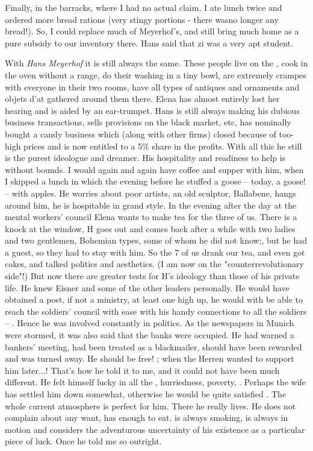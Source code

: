 Finally, in the barracks, where I had no actual claim, I ate lunch twice and ordered more bread rations (very stingy portions - there wasno longer any bread!). So, I could replace much of Meyerhof's, and still bring much home as a pure subsidy to our inventory there. Hans said that zi was a very apt student.

With \textit{Hans Meyerhof} it is still always the same. These people live on the , cook in the oven without a range, do their washing in a tiny bowl, are extremely crampes with everyone in their two rooms, have all types of antiques and ornaments and objets d'at gathered around them there. Elena has almost entirely lost her hearing and is aided by an ear-trumpet. Hans is still always making his dubious business transactions, sells provisions on the black market, etc, has nominally bought a candy business which (along with other firms) closed because of too-high prices and is now entitled to a 5\% share in the profits. With all this he still is the purest ideologue and dreamer. His hospitality and readiness to help is without bounds. I would again and again have coffee and supper with him,  when I skipped a lunch in which the evening before he stuffed a goose -- today, a goose! -- with apples. He worries about poor artists, an old sculptor, Ballabene, hangs around him, he is hospitable in grand style. In the evening after the day at the mental workers' council Elena wants to make tea for the three of us. There is a knock at the window, H goes out and comes back after a while with two ladies and two gentlemen, Bohemian types, some of whom he did not know;, but he had a guest, so they had to stay with him. So the 7 of us drank our tea, and even got cakes, and talked politics and aesthetics. (I am now on the "counterrevolutionary side"!) But now there are greater tests for H's ideology than those of his private life. He knew Eisner and some of the other leaders personally. He would have obtained a post, if not a ministry, at least one high up, he would with be able to reach the soldiers' council with ease with his handy connections to all the  soldiers -- . Hence he was involved constantly in politics. As the newspapers in Munich were stormed, it was also said that the banks were occupied. He had warned a bankers' meeting, had been treated as a blackmailer, should have been rewarded and was turned away. He should be free! ; when the Herren wanted to support him later...! That's how he told it to me, and it could not have been much different. He felt himself lucky in all the , hurriedness, poverty, . Perhaps the wife has settled him down somewhat, otherwise he would be quite satisfied . The whole current atmosphere is perfect for him. There he really lives. He does not complain about any want, has enough to eat, is always smoking, is always in motion and considers the adventurous uncertainty of his existence as a particular piece of luck. Once he told me so outright. 